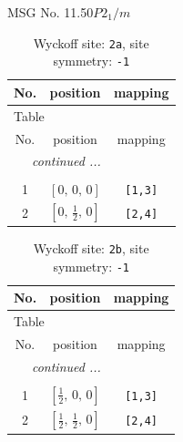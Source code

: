 \documentclass[fleqn,8pt]{jsarticle}
\begin{document}
\setcounter{MaxMatrixCols}{32}

\renewcommand{\tablename}{Table~}
\renewcommand{\figurename}{Figure~}
\begin{center}
\LARGE
MSG No. 11.50\quad$P2_{1}/m$
\end{center}
\renewcommand{\arraystretch}{1.2}
\begin{longtable}{ccc}
\caption{Wyckoff site: {\tt 2a}, site symmetry: {\tt -1}}
 \\
 \hline \hline
No. & position & mapping \\ \hline \endfirsthead

\multicolumn{2}{l}{\tablename\ \thetable{}} \\
 \hline \hline
No. & position & mapping \\ \hline \endhead

 \hline \hline
\multicolumn{2}{r}{\footnotesize\it continued ...} \\ \endfoot

 \hline \hline
\multicolumn{2}{r}{} \\ \endlastfoot

1 & $\left[ 0,\, 0,\, 0 \right]$ & {\tt [1,3]} \\ \hline
2 & $\left[ 0,\, \frac{1}{2},\, 0 \right]$ & {\tt [2,4]} \\
\end{longtable}
\renewcommand{\arraystretch}{1.2}
\begin{longtable}{ccc}
\caption{Wyckoff site: {\tt 2b}, site symmetry: {\tt -1}}
 \\
 \hline \hline
No. & position & mapping \\ \hline \endfirsthead

\multicolumn{2}{l}{\tablename\ \thetable{}} \\
 \hline \hline
No. & position & mapping \\ \hline \endhead

 \hline \hline
\multicolumn{2}{r}{\footnotesize\it continued ...} \\ \endfoot

 \hline \hline
\multicolumn{2}{r}{} \\ \endlastfoot

1 & $\left[ \frac{1}{2},\, 0,\, 0 \right]$ & {\tt [1,3]} \\ \hline
2 & $\left[ \frac{1}{2},\, \frac{1}{2},\, 0 \right]$ & {\tt [2,4]} \\
\end{longtable}
\renewcommand{\arraystretch}{1.2}
\end{document}
